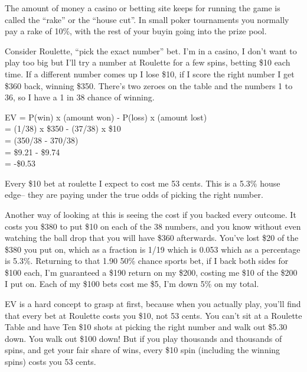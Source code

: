 The amount of money a casino or betting site keeps for running the
game is called the ``rake'' or the ``house cut''.
In small poker tournaments you normally pay a rake of 10\%, with the
rest of your buyin going into the prize pool.

Consider Roulette, ``pick the exact number'' bet. I'm in a casino,
I don't want to play too big but I'll try a number at Roulette for a few
spins, betting \$10 each time. If a different number comes up I lose \$10,
if I score the right number I get \$360 back, winning \$350. There's two
zeroes on the table and the numbers 1 to 36, so I have a 1 in 38 chance of
winning.

EV = P(win) x (amount won) - P(loss) x (amount lost) \\
   = (1/38) x \$350 - (37/38) x \$10 \\
   = (350/38 - 370/38)  \\
   = \$9.21 - \$9.74 \\
   = -\$0.53

Every \$10 bet at roulette I expect to cost me 53 cents. This is a 5.3\% house
edge-- they are paying under the true odds of picking the right
number.

Another way of looking at this is seeing the cost if you backed every
outcome. It costs you \$380 to put \$10 on each of the 38 numbers, and
you know without even watching the ball drop that you will have \$360
afterwards. You've lost \$20 of the \$380 you put on, which as a
fraction is 1/19 which is 0.053 which as a percentage is 5.3\%.
Returning to that 1.90 50\% chance sports bet, if I back both sides for
\$100 each, I'm guaranteed a \$190 return on my \$200, costing me \$10
of the \$200 I put on. Each of my \$100 bets cost me \$5, I'm down 5\%
on my total.


EV is a hard concept to grasp at first, because when you actually
play, you'll find that every bet at Roulette costs you \$10, not
53 cents. You can't sit at a Roulette Table and
have Ten \$10 shots at picking the right number and walk out \$5.30
down. You walk out \$100 down! But if you play thousands and thousands
of spins, and get your fair share of wins, every \$10 spin (including
the winning spins) costs you 53 cents.

